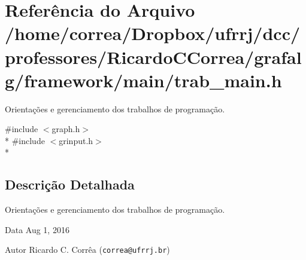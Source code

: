 \section{Referência do Arquivo /home/correa/\+Dropbox/ufrrj/dcc/professores/\+Ricardo\+C\+Correa/grafalg/framework/main/trab\+\_\+main.h}
\label{trab__main_8h}


Orientações e gerenciamento dos trabalhos de programação.  


{\ttfamily \#include $<$graph.\+h$>$}\\*
{\ttfamily \#include $<$grinput.\+h$>$}\\*


\subsection{Descrição Detalhada}
Orientações e gerenciamento dos trabalhos de programação. 

\begin{DoxyDate}{Data}
Aug 1, 2016 
\end{DoxyDate}
\begin{DoxyAuthor}{Autor}
Ricardo C. Corrêa ({\tt correa@ufrrj.\+br}) 
\end{DoxyAuthor}

